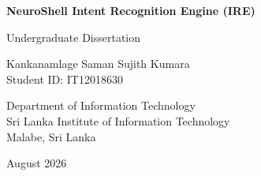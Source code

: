 ﻿\documentclass[a4paper,12pt,oneside]{report}
\begin{document}
\begin{titlepage}
\centering
\vspace*{2cm}
{\LARGE\bfseries NeuroShell Intent Recognition Engine (IRE)\par}
\vspace{1.5cm}
{\Large Undergraduate Dissertation\par}
\vspace{2cm}
{\large Kankanamlage Saman Sujith Kumara\\
Student ID: IT12018630\par}
\vspace{2cm}
{\large Department of Information Technology\\
Sri Lanka Institute of Information Technology\\
Malabe, Sri Lanka\par}
\vspace{2cm}
{\large August 2026\par}
\end{titlepage}

\tableofcontents
\listoffigures
\listoftables
\clearpage








\printbibliography[heading=bibintoc,title={References}]
\end{document}
